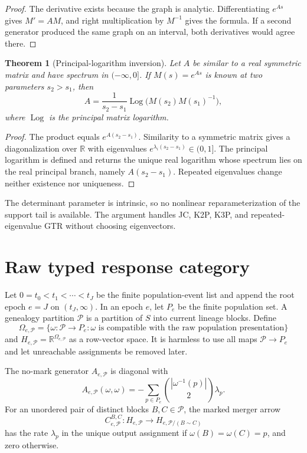 \documentclass[11pt]{article}
\newtheorem{theorem}{Theorem}[section]
\newcommand{\R}{\mathbb R}
\newcommand{\cP}{\mathcal P}
\begin{document}
\begin{proof}
The derivative exists because the graph is analytic.  Differentiating $e^{As}$ gives $M'=AM$, and right multiplication by $M^{-1}$ gives the formula.  If a second generator produced the same graph on an interval, both derivatives would agree there.
\end{proof}

\begin{theorem}[Principal-logarithm inversion]
Let $A$ be similar to a real symmetric matrix and have spectrum in $(-\infty,0]$.  If $M(s)=e^{As}$ is known at two parameters $s_2>s_1$, then
\[
A=\frac{1}{s_2-s_1}\operatorname{Log}\bigl(M(s_2)M(s_1)^{-1}\bigr),
\]
where $\operatorname{Log}$ is the principal matrix logarithm.
\end{theorem}

\begin{proof}
The product equals $e^{A(s_2-s_1)}$.  Similarity to a symmetric matrix gives a diagonalization over $\R$ with eigenvalues $e^{\lambda_i(s_2-s_1)}\in(0,1]$.  The principal logarithm is defined and returns the unique real logarithm whose spectrum lies on the real principal branch, namely $A(s_2-s_1)$.  Repeated eigenvalues change neither existence nor uniqueness.
\end{proof}

The determinant parameter is intrinsic, so no nonlinear reparameterization of the support tail is available.  The argument handles JC, K2P, K3P, and repeated-eigenvalue GTR without choosing eigenvectors.

\section{Raw typed response category}
\label{sec:raw}

Let $0=t_0<t_1<\cdots<t_J$ be the finite population-event list and append the root epoch $e=J$ on $(t_J,\infty)$.  In an epoch $e$, let $P_e$ be the finite population set.  A genealogy partition $\cP$ is a partition of $S$ into current lineage blocks.  Define
\[
\Omega_{e,\cP}=\{\omega:\cP\to P_e:\omega\text{ is compatible with the raw population presentation}\}
\]
and $H_{e,\cP}=\R^{\Omega_{e,\cP}}$ as a row-vector space.  It is harmless to use all maps $\cP\to P_e$ and let unreachable assignments be removed later.

The no-mark generator $A_{e,\cP}$ is diagonal with
\[
A_{e,\cP}(\omega,\omega)
=-\sum_{p\in P_e}\binom{|\omega^{-1}(p)|}{2}\lambda_p.
\]
For an unordered pair of distinct blocks $B,C\in\cP$, the marked merger arrow
\[
C^{B,C}_{e,\cP}:H_{e,\cP}\to H_{e,\cP/(B\sim C)}
\]
has the rate $\lambda_p$ in the unique output assignment if $\omega(B)=\omega(C)=p$, and zero otherwise.
\end{document}
